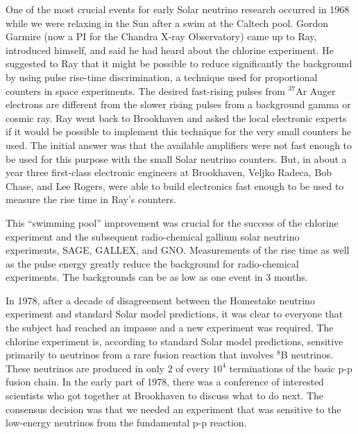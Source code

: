 \documentclass[a4paper,10pt]{article}
\begin{document}
{\noindent}One of the most crucial events for early Solar neutrino research occurred in 1968 while we were relaxing in the Sun after a swim at the Caltech pool. Gordon Garmire (now a PI for the Chandra X-ray Observatory) came up to Ray, introduced himself, and said he had heard about the chlorine experiment. He suggested to Ray that it might be possible to reduce significantly the background by using pulse rise-time discrimination, a technique used for proportional counters in space experiments. The desired fast-rising pulses from $^{37}$Ar Auger electrons are different from the slower rising pulses from a background gamma or cosmic ray. Ray went back to Brookhaven and asked the local electronic experts if it would be possible to implement this technique for the very small counters he used. The initial answer was that the available amplifiers were not fast enough to be used for this purpose with the small Solar neutrino counters. But, in about a year three first-class electronic engineers at Brookhaven, Veljko Radeca, Bob Chase, and Lee Rogers, were able to build electronics fast enough to be used to measure the rise time in Ray's counters.

{\noindent}This ``swimming pool'' improvement was crucial for the success of the chlorine experiment and the subsequent radio-chemical gallium solar neutrino experiments, SAGE, GALLEX, and GNO. Measurements of the rise time as well as the pulse energy greatly reduce the background for radio-chemical experiments. The backgrounds can be as low as one event in 3 months. 

{\noindent}In 1978, after a decade of disagreement between the Homestake neutrino experiment and standard Solar model predictions, it was clear to everyone that the subject had reached an impasse and a new experiment was required. The chlorine experiment is, according to standard Solar model predictions, sensitive primarily to neutrinos from a rare fusion reaction that involves $^8$B neutrinos. These neutrinos are produced in only $2$ of every $10^4$ terminations of the basic p-p fusion chain. In the early part of 1978, there was a conference of interested scientists who got together at Brookhaven to discuss what to do next. The consensus decision was that we needed an experiment that was sensitive to the low-energy neutrinos from the fundamental p-p reaction.
\end{document}
